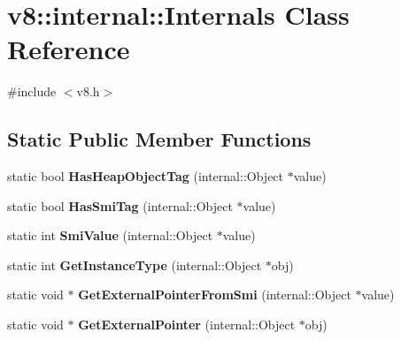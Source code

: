 \hypertarget{classv8_1_1internal_1_1_internals}{}\section{v8\+:\+:internal\+:\+:Internals Class Reference}
\label{classv8_1_1internal_1_1_internals}


{\ttfamily \#include $<$v8.\+h$>$}

\subsection*{Static Public Member Functions}
\begin{DoxyCompactItemize}
\item 
\hypertarget{classv8_1_1internal_1_1_internals_a2d3dc335df00b84e7e242e40012238ae}{}static bool {\bfseries Has\+Heap\+Object\+Tag} (internal\+::\+Object $\ast$value)\label{classv8_1_1internal_1_1_internals_a2d3dc335df00b84e7e242e40012238ae}

\item 
\hypertarget{classv8_1_1internal_1_1_internals_a6163342aeb37f207d618d9fb5d646a04}{}static bool {\bfseries Has\+Smi\+Tag} (internal\+::\+Object $\ast$value)\label{classv8_1_1internal_1_1_internals_a6163342aeb37f207d618d9fb5d646a04}

\item 
\hypertarget{classv8_1_1internal_1_1_internals_a9a26879dad8b7fdd38ebbeaad162b96c}{}static int {\bfseries Smi\+Value} (internal\+::\+Object $\ast$value)\label{classv8_1_1internal_1_1_internals_a9a26879dad8b7fdd38ebbeaad162b96c}

\item 
\hypertarget{classv8_1_1internal_1_1_internals_aec6dbaf56b230e37eef5ed1ed0e56a9b}{}static int {\bfseries Get\+Instance\+Type} (internal\+::\+Object $\ast$obj)\label{classv8_1_1internal_1_1_internals_aec6dbaf56b230e37eef5ed1ed0e56a9b}

\item 
\hypertarget{classv8_1_1internal_1_1_internals_a8d2a279f64ec567973765a5704b63b07}{}static void $\ast$ {\bfseries Get\+External\+Pointer\+From\+Smi} (internal\+::\+Object $\ast$value)\label{classv8_1_1internal_1_1_internals_a8d2a279f64ec567973765a5704b63b07}

\item 
\hypertarget{classv8_1_1internal_1_1_internals_a77c94e6b4e68d6c73dec78d81a0c219a}{}static void $\ast$ {\bfseries Get\+External\+Pointer} (internal\+::\+Object $\ast$obj)\label{classv8_1_1internal_1_1_internals_a77c94e6b4e68d6c73dec78d81a0c219a}


\end{DoxyCompactItemize}
